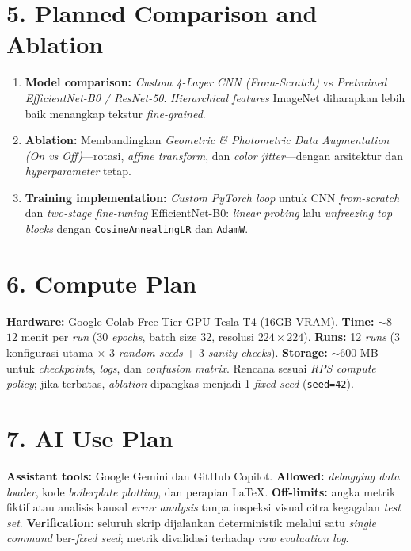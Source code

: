 \documentclass[9pt,a4paper]{extarticle}
\begin{document}
\section*{5. Planned Comparison and Ablation}
\begin{enumerate}
    \item \textbf{Model comparison:} \textit{Custom 4-Layer CNN (From-Scratch)} vs \textit{Pretrained EfficientNet-B0 / ResNet-50}. \textit{Hierarchical features} ImageNet diharapkan lebih baik menangkap tekstur \textit{fine-grained}.
    \item \textbf{Ablation:} Membandingkan \textit{Geometric \& Photometric Data Augmentation (On vs Off)}---rotasi, \textit{affine transform}, dan \textit{color jitter}---dengan arsitektur dan \textit{hyperparameter} tetap.
    \item \textbf{Training implementation:} \textit{Custom PyTorch loop} untuk CNN \textit{from-scratch} dan \textit{two-stage fine-tuning} EfficientNet-B0: \textit{linear probing} lalu \textit{unfreezing top blocks} dengan \texttt{CosineAnnealingLR} dan \texttt{AdamW}.
\end{enumerate}

\section*{6. Compute Plan}
\noindent\textbf{Hardware:} Google Colab Free Tier GPU Tesla T4 (16GB VRAM). \textbf{Time:} $\sim 8$--$12$ menit per \textit{run} (30 \textit{epochs}, batch size 32, resolusi $224\times224$). \textbf{Runs:} 12 \textit{runs} (3 konfigurasi utama $\times$ 3 \textit{random seeds} + 3 \textit{sanity checks}). \textbf{Storage:} $\sim 600$ MB untuk \textit{checkpoints}, \textit{logs}, dan \textit{confusion matrix}. Rencana sesuai \textit{RPS compute policy}; jika terbatas, \textit{ablation} dipangkas menjadi 1 \textit{fixed seed} (\texttt{seed=42}).

\section*{7. AI Use Plan}
\noindent\textbf{Assistant tools:} Google Gemini dan GitHub Copilot. \textbf{Allowed:} \textit{debugging data loader}, kode \textit{boilerplate plotting}, dan perapian LaTeX. \textbf{Off-limits:} angka metrik fiktif atau analisis kausal \textit{error analysis} tanpa inspeksi visual citra kegagalan \textit{test set}. \textbf{Verification:} seluruh skrip dijalankan deterministik melalui satu \textit{single command} ber-\textit{fixed seed}; metrik divalidasi terhadap \textit{raw evaluation log}.
\end{document}
